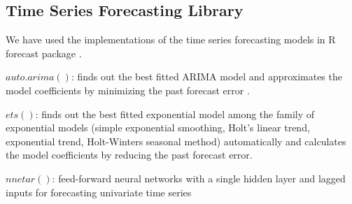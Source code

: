 \subsection{Time Series Forecasting Library}

We have used the implementations of the time series forecasting models in R forecast package  \cite{forecastPackage}.

$auto.arima()$:  finds out the best fitted ARIMA model and approximates the model coefficients by minimizing the past forecast error \cite{Forecasting_OTexts}.

$ets()$: finds out the best fitted exponential model among the family of exponential models (simple exponential smoothing, Holt's linear trend, exponential trend, Holt-Winters seasonal method) automatically and calculates the model coefficients by reducing the past forecast error. \cite{Forecasting_OTexts}
    
$nnetar()$: feed-forward neural networks with a single hidden layer and lagged inputs for forecasting univariate time series